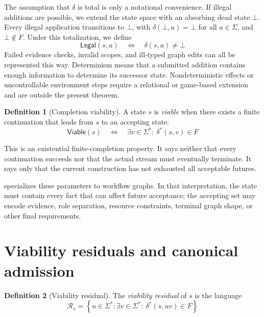 \documentclass[11pt]{article}
\theoremstyle{definition}
\newtheorem{definition}[definition]{Definition}
\newcommand{\Additions}{\Sigma}
\newcommand{\Accept}{F}
\newcommand{\Run}{\delta^{*}}
\newcommand{\Viable}{\mathsf{Viable}}
\newcommand{\Residual}{\mathcal R}
\newcommand{\Legal}{\mathsf{Legal}}
\begin{document}
The assumption that \(\delta\) is total is only a notational convenience. If illegal additions are possible, we extend the state space with an absorbing dead state \(\bot\). Every illegal application transitions to \(\bot\), with \(\delta(\bot,a)=\bot\) for all \(a\in\Sigma\), and \(\bot\notin F\). Under this totalization, we define 
\[
  \Legal(s,a)\quad\Longleftrightarrow\quad\delta(s,a)\ne\bot
\]
Failed evidence checks, invalid scopes, and ill-typed graph edits can all be represented this way. Determinism means that a submitted addition contains enough information to determine its successor state. Nondeterministic effects or uncontrollable environment steps require a relational or game-based extension and are outside the present theorem.

\begin{definition}[Completion viability]\label{def:viability}
A state $s$ is \emph{viable} when there exists a finite continuation that leads from $s$ to an accepting state:
\begin{equation}\label{eq:viability}
  \Viable(s)
  \quad\Longleftrightarrow\quad
  \exists v\in\Additions^*:\ \Run(s,v)\in\Accept
\end{equation}
\end{definition}

This is an existential finite-completion property. It says neither that every continuation succeeds nor that the actual stream must eventually terminate. It says only that the current construction has not exhausted all acceptable futures.

 specializes these parameters to workflow graphs. In that interpretation, the state must contain every fact that can affect future acceptance; the accepting set may encode evidence, role separation, resource constraints, terminal graph shape, or other final requirements.

\section{Viability residuals and canonical admission}\label{sec:residual}

\begin{definition}[Viability residual]\label{def:residual}
The \emph{viability residual} of $s$ is the language
\begin{equation}\label{eq:residual}
  \Residual_s
  =\left\{
      u\in\Additions^*:
      \exists v\in\Additions^*:\ \Run(s,uv)\in\Accept
    \right\}
\end{equation}
\end{definition}
\end{document}
